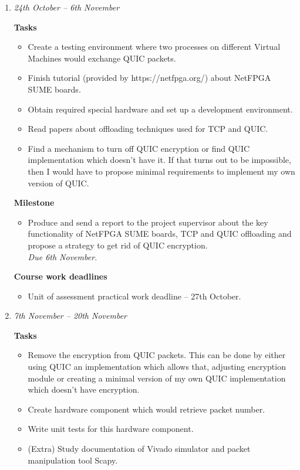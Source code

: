 \documentclass[a4paper,12pt]{article}
\begin{document}
 \begin{enumerate}
  \item \emph{24th October -- 6th November}

\textbf{Tasks}
 \begin{itemize}
  \item Create a testing environment where two processes on different Virtual Machines would exchange QUIC packets.
  \item Finish tutorial (provided by https://netfpga.org/) about NetFPGA SUME boards.
  \item Obtain required special hardware and set up a development environment.
 \item Read papers about offloading techniques used for TCP and QUIC.
 \item Find a mechanism to turn off QUIC encryption or find QUIC implementation which doesn't have it.
  If that turns out to be impossible, then I would have to propose minimal requirements to implement my own version of QUIC. 
 \end{itemize}


\textbf{Milestone}
 \begin{itemize}
  \item Produce and send a report to the project supervisor about the key functionality of NetFPGA SUME boards, TCP and QUIC offloading and propose a strategy to get rid of QUIC encryption.\\
\emph{Due 6th November.}
 \end{itemize}
 
\textbf{Course work deadlines}
 \begin{itemize}
  \item Unit of assessment practical work deadline -- 27th October.
 \end{itemize} 




 \item 
 \emph{7th November -- 20th November}

\textbf{Tasks}
 \begin{itemize}
  \item 
  Remove the encryption from QUIC packets. 
  This can be done by either using QUIC an implementation which allows that, adjusting encryption module or creating a minimal version of my own QUIC implementation which doesn't have encryption.
  \item 
  Create hardware component which would retrieve packet number.
 \item 
  Write unit tests for this hardware component.
 \item 
  (Extra) Study documentation of Vivado simulator and packet manipulation tool Scapy.
 \end{itemize}


\end{enumerate}
\end{document}
